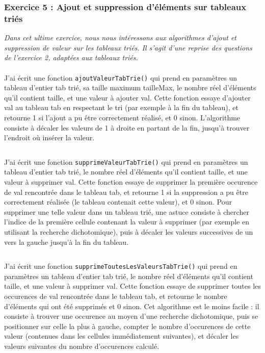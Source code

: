 \subsubsection{Exercice 5 : Ajout et suppression d’éléments sur tableaux triés}
\textit{Dans cet ultime exercice, nous nous intéressons aux algorithmes d’ajout et suppression de valeur sur les tableaux triés. Il s’agit d’une reprise des questions de l’exercice 2, adaptées aux tableaux triés.}
\\\\
J'ai écrit une fonction \texttt{ajoutValeurTabTrie()} qui prend en paramètres un tableau d’entier tab trié, sa taille maximum tailleMax, le nombre réel d’éléments qu’il contient taille, et une valeur à ajouter val. Cette fonction essaye d’ajouter val au tableau tab en respectant le tri (par exemple à la fin du tableau), et retourne 1 si l’ajout a pu être correctement réalisé, et 0 sinon. L’algorithme consiste à décaler les valeurs de 1 à droite en partant de la fin, jusqu’à trouver l’endroit où insérer la valeur.
\inputminted[linenos,firstline=7,lastline=25]{cpp}{../sources/cpp/TP1-2/modifTableauxTries.c}

J'ai écrit une fonction \texttt{supprimeValeurTabTrie()} qui prend en paramètres un tableau d’entier tab trié, le nombre réel d’éléments qu’il contient taille, et une valeur à supprimer val. Cette fonction essaye de supprimer la première occurence de val rencontrée dans le tableau tab, et retourne 1 si la suppression a pu être correctement réalisée (le tableau contenait cette valeur), et 0 sinon. Pour supprimer une telle valeur dans un tableau trié, une astuce consiste à chercher l’indice de la première cellule contenant la valeur à supprimer (par exemple en utilisant la recherche dichotomique), puis à décaler les valeurs successives de un vers la gauche jusqu’à la fin du tableau.
\inputminted[linenos,firstline=27,lastline=46]{cpp}{../sources/cpp/TP1-2/modifTableauxTries.c}

J'ai écrit une fonction \texttt{supprimeToutesLesValeursTabTrie()} qui prend en paramètres un tableau d’entier tab trié, le nombre réel d’éléments qu’il contient taille, et une valeur à supprimer val. Cette fonction essaye de supprimer toutes les occurences de val rencontrée dans le tableau tab, et retourne le nombre d’éléments qui ont été supprimés et 0 sinon. Cet algorithme est le moins facile : il consiste à trouver une occurence au moyen d’une recherche dichotomique, puis se positionner sur celle la plus à gauche, compter le nombre d’occurences de cette valeur (contenues dans les cellules immédiatement suivantes), et décaler les valeurs suivantes du nombre d’occurences calculé.
\inputminted[linenos,firstline=48,lastline=81]{cpp}{../sources/cpp/TP1-2/modifTableauxTries.c}


